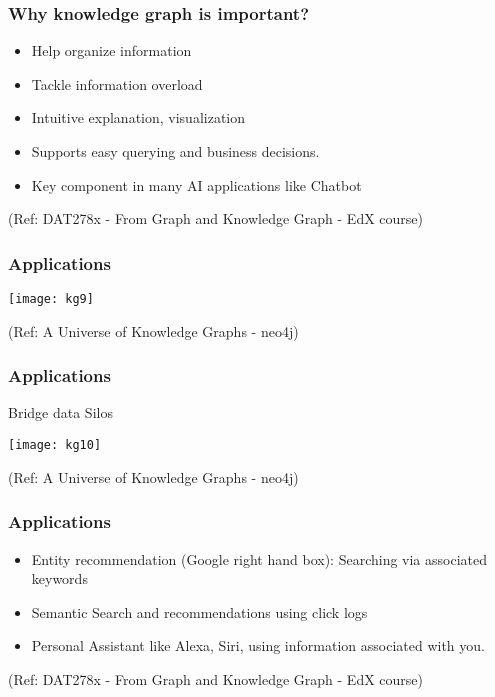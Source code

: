\begin{frame}\frametitle{Why knowledge graph is important?}

\begin{itemize}
\item Help organize information
\item Tackle information overload
\item Intuitive explanation, visualization
\item Supports easy querying and business decisions.
\item Key component in many AI applications like Chatbot
\end{itemize}

{\tiny (Ref: DAT278x - From Graph and Knowledge Graph - EdX course)}
\end{frame}

\begin{frame}[fragile]\frametitle{Applications}
 
 
			\begin{center}
			\texttt{[image: kg9]}
			\end{center}	
			
			{\tiny (Ref: A Universe of Knowledge Graphs - neo4j)}
		
	
\end{frame}

\begin{frame}[fragile]\frametitle{Applications}
 
 Bridge data Silos
 
			\begin{center}
			\texttt{[image: kg10]}
			\end{center}	
			
			{\tiny (Ref: A Universe of Knowledge Graphs - neo4j)}
		
	
\end{frame}



\begin{frame}\frametitle{Applications}

\begin{itemize}
\item Entity recommendation (Google right hand box): Searching via associated keywords
\item Semantic Search and recommendations using click logs
\item Personal Assistant like Alexa, Siri, using information associated with you.
\end{itemize}

{\tiny (Ref: DAT278x - From Graph and Knowledge Graph - EdX course)}
\end{frame}


